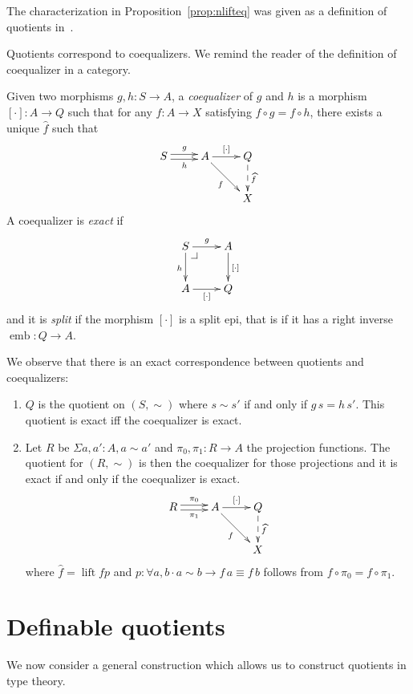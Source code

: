 \documentclass{llncs}
\makeatletter
\newcommand{\bocks}[1]{[#1]}
\newcommand{\lift}[1]{\widehat{#1}}
\DeclareMathOperator*{\emb}{\mathrm{emb}}
\newcommand{\pullbackcorner}[1][dr]{\save*!/#1-1.2pc/#1:(-1,1)@^{|-}\restore}
\DeclareMathOperator{\nlift}{\mathrm{lift}}
\makeatother
\begin{document}
The characterization in Proposition~\ref{prop:nlifteq} was given as a definition of quotients in~\cite{hofmann:thesis}.


Quotients correspond to coequalizers. We remind the reader of the definition of coequalizer in a category. 

\begin{definition}
Given two morphisms $g,h : S\to A$, a \emph{coequalizer} of $g$ and $h$ is a morphism $\bocks\cdot:A\to Q$ such that for any $f:A\to X$ satisfying $f \circ g = f \circ h$, there exists a unique $\lift f$ such that  
\[\xymatrix{
S\ar@<0.5ex>[r]^g\ar@<-0.5ex>[r]_h& A\ar[r]^{\bocks\cdot}\ar[dr]_{f} & Q\ar@{-->}[d]^{\lift f}\\
&&X
}\]
A coequalizer is \emph{exact} if 
\[\xymatrix{
S\pullbackcorner\ar[r]^g\ar[d]_h & A\ar[d]^{\bocks\cdot} \\
A\ar[r]_{\bocks\cdot} & Q
}\]
and it is \emph{split} if the morphism $\bocks\cdot$ is a split epi, that is if it has a right inverse $\emb : Q \to A$.
\end{definition}

We observe that there is an exact correspondence between quotients and coequalizers:
\begin{proposition}\hfill
\begin{enumerate}
\item $Q$ is the quotient on $(S,\sim)$ where $s\sim s'$ if and only if $g\,s=h\,s'$.
This quotient is exact if{f} the coequalizer is exact.
\item Let $R$ be $\Sigma a,a':A,a\sim a'$ and $\pi_0,\pi_1 : R\to A$ the projection functions. The quotient for $(R,\sim)$ is then the coequalizer for those projections and it is exact if and only if the coequalizer is exact.
\[\xymatrix{
R\ar@<0.5ex>[r]^{\pi_0}\ar@<-0.5ex>[r]_{\pi_1}& A\ar[r]^{\bocks\cdot}\ar[dr]_{f} & Q\ar@{-->}[d]^{\lift f}\\
&&X
}\]
where $\lift f=\nlift f p$ and $p \colon \forall a,b\cdot a\sim b \to f\,a \equiv f\,b$ follows from $f \circ \pi_0 = f \circ \pi_1$.
\end{enumerate}
\end{proposition}

\section{Definable quotients\\ }\label{sec:defquotients}

We now consider a general construction which allows us to construct quotients in type theory.
\end{document}
